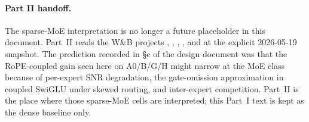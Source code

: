 \paragraph{Part II handoff.}
The sparse-MoE interpretation is no longer a future placeholder in this document. Part~II reads the W\&B projects , , , , and  at the explicit 2026-05-19 snapshot. The prediction recorded in \S c of the design document was that the RoPE-coupled gain seen here on A0/B/G/H might narrow at the MoE class because of per-expert SNR degradation, the gate-omission approximation in coupled SwiGLU under skewed routing, and inter-expert competition. Part~II is the place where those sparse-MoE cells are interpreted; this Part~I text is kept as the dense baseline only.
